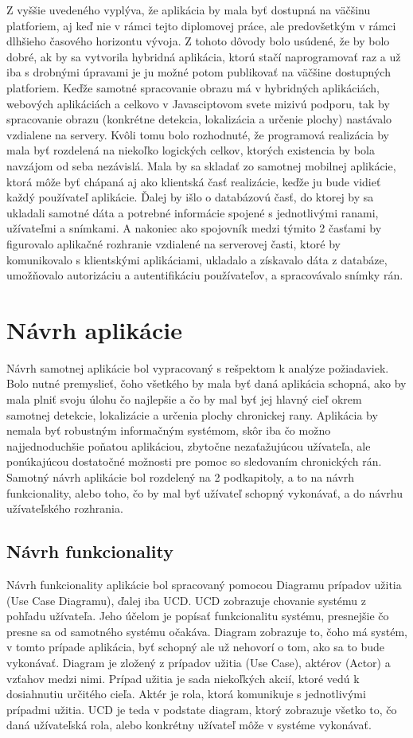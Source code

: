Z vyššie uvedeného vyplýva, že aplikácia by mala byť dostupná na väčšinu platforiem, aj keď nie v rámci tejto diplomovej práce, ale predovšetkým v rámci dlhšieho časového horizontu vývoja. Z tohoto dôvody bolo usúdené, že by bolo dobré, ak by sa vytvorila hybridná aplikácia, ktorú stačí naprogramovať raz a už iba s drobnými úpravami je ju možné potom publikovať na väčšine dostupných platforiem. Keďže samotné spracovanie obrazu má v hybridných aplikáciách, webových aplikáciách a celkovo v Javasciptovom svete mizivú podporu, tak by spracovanie obrazu (konkrétne detekcia, lokalizácia a určenie plochy) nastávalo vzdialene na servery. Kvôli tomu bolo rozhodnuté, že programová realizácia by mala byť rozdelená na niekoľko logických celkov, ktorých existencia by bola navzájom od seba nezávislá. Mala by sa skladať zo samotnej mobilnej aplikácie, ktorá môže byť chápaná aj ako klientská časť realizácie, keďže ju bude vidieť každý používateľ aplikácie. Ďalej by išlo o databázovú časť, do ktorej by sa ukladali samotné dáta a potrebné informácie spojené s jednotlivými ranami, užívateľmi a snímkami. A nakoniec ako spojovník medzi týmito 2 časťami by figurovalo aplikačné rozhranie vzdialené na serverovej časti, ktoré by komunikovalo s klientskými aplikáciami, ukladalo a získavalo dáta z databáze, umožňovalo autorizáciu a autentifikáciu používateľov, a spracovávalo snímky rán.

\section{Návrh aplikácie}
Návrh samotnej aplikácie bol vypracovaný s rešpektom k analýze požiadaviek. Bolo nutné premyslieť, čoho všetkého by mala byť daná aplikácia schopná, ako by mala plniť svoju úlohu čo najlepšie a čo by mal byť jej hlavný cieľ okrem samotnej detekcie, lokalizácie a určenia plochy chronickej rany. Aplikácia by nemala byť robustným informačným systémom, skôr iba čo možno najjednoduchšie poňatou aplikáciou, zbytočne nezaťažujúcou užívateľa, ale ponúkajúcou dostatočné možnosti pre pomoc so sledovaním chronických rán. Samotný návrh aplikácie bol rozdelený na 2 podkapitoly, a to na návrh funkcionality, alebo toho, čo by mal byť užívateľ schopný vykonávať, a do návrhu užívateľského rozhrania.

\subsection{Návrh funkcionality}
Návrh funkcionality aplikácie bol spracovaný pomocou Diagramu prípadov užitia (Use Case Diagramu), ďalej iba UCD. UCD zobrazuje chovanie systému z pohľadu užívateľa. Jeho účelom je popísať funkcionalitu systému, presnejšie čo presne sa od samotného systému očakáva. Diagram zobrazuje to, čoho má systém, v tomto prípade aplikácia, byť schopný ale už nehovorí o tom, ako sa to bude vykonávať. Diagram je zložený z prípadov užitia (Use Case), aktérov (Actor) a vzťahov medzi nimi. Prípad užitia je sada niekoľkých akcií, ktoré vedú k dosiahnutiu určitého cieľa. Aktér je rola, ktorá komunikuje s jednotlivými prípadmi užitia. UCD je teda v podstate diagram, ktorý zobrazuje všetko to, čo daná užívateľská rola, alebo konkrétny užívateľ môže v systéme vykonávať.

